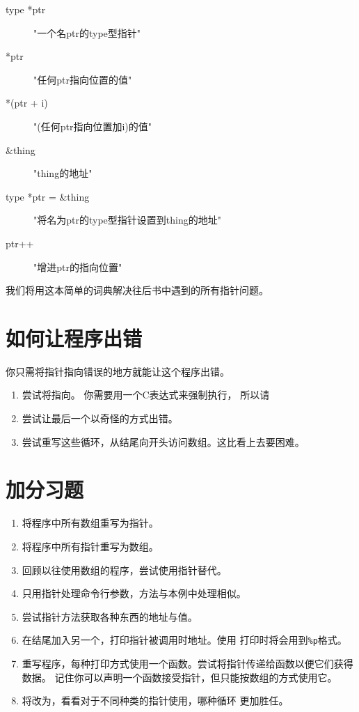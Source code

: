\begin{description}
\item[type *ptr] "一个名ptr的type型指针"
\item[*ptr] "任何ptr指向位置的值"
\item[*(ptr + i)] "(任何ptr指向位置加i)的值"
\item[\&thing] "thing的地址"
\item[type *ptr = \&thing] "将名为ptr的type型指针设置到thing的地址"
\item[ptr++] "增进ptr的指向位置"
\end{description}

我们将用这本简单的词典解决往后书中遇到的所有指针问题。

\section{如何让程序出错}

你只需将指针指向错误的地方就能让这个程序出错。

\begin{enumerate}
\item 尝试将指向。 你需要用一个C表达式来强制执行，
	所以请
\item 尝试让最后一个以奇怪的方式出错。
\item 尝试重写这些循环，从结尾向开头访问数组。这比看上去要困难。
\end{enumerate}

\section{加分习题}

\begin{enumerate}
\item 将程序中所有数组重写为指针。
\item 将程序中所有指针重写为数组。
\item 回顾以往使用数组的程序，尝试使用指针替代。
\item 只用指针处理命令行参数，方法与本例中处理相似。
\item 尝试指针方法获取各种东西的地址与值。
\item 在结尾加入另一个，打印指针被调用时地址。使用
	打印时将会用到\verb|%p|格式。
\item 重写程序，每种打印方式使用一个函数。尝试将指针传递给函数以便它们获得数据。
	记住你可以声明一个函数接受指针，但只能按数组的方式使用它。
\item 将改为，看看对于不同种类的指针使用，哪种循环
	更加胜任。
\end{enumerate}


